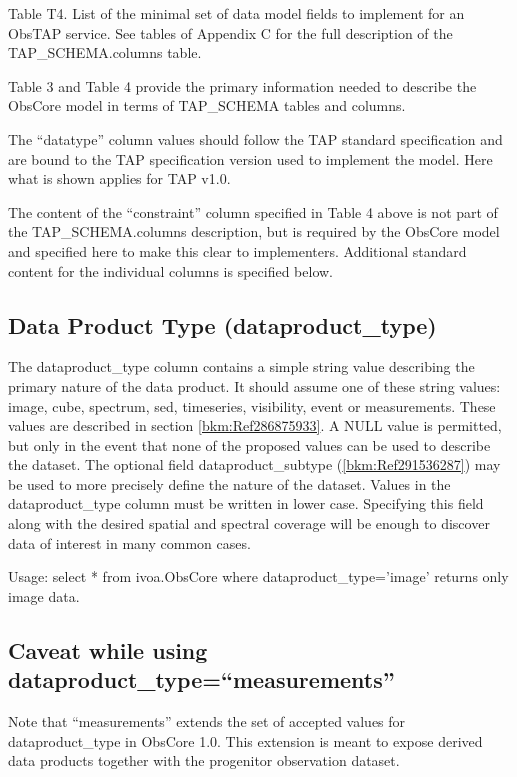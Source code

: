 \documentclass[11pt,a4paper]{ivoa}
\begin{document}
\label{tab:4}Table T4. List of the minimal set of data model fields to
implement for an ObsTAP service. See tables of Appendix C for the full description of the TAP\_SCHEMA.columns table. 

Table 3 and Table 4 provide the primary information needed to describe the ObsCore model in terms of TAP\_SCHEMA tables
and columns. 

The ``datatype'' column values should follow the TAP standard specification and are bound to the TAP specification
version used to implement the model. Here what is shown applies for TAP v1.0. 

The content of the ``constraint'' column specified in Table 4 above is not part of the TAP\_SCHEMA.columns description,
but is required by the ObsCore model and specified here to make this clear to implementers.  Additional standard
content for the individual columns is specified below. 

\subsection{Data Product Type (dataproduct\_type)}
The dataproduct\_type column contains a simple string value describing the primary nature of the data product.  It
should assume one of these string values: image, cube, spectrum, sed, timeseries, visibility, event or measurements. 
These values are described in section \ref{bkm:Ref286875933}.  A NULL value is permitted, but only in the event that
none of the proposed values can be used to describe the dataset.  The optional field dataproduct\_subtype
(\ref{bkm:Ref291536287}) may be used to more precisely define the nature of the dataset.  Values in the
dataproduct\_type column must be written in lower case. Specifying this field along with the desired spatial and
spectral coverage will be enough to discover data of interest in many common cases. 

Usage: select * from ivoa.ObsCore where dataproduct\_type='image' returns only image data.

\subsection{ Caveat while using dataproduct\_type=``measurements''}
Note that ``measurements'' extends the set of accepted values for dataproduct\_type in ObsCore 1.0. This extension is
meant to expose derived data products together with the progenitor observation dataset. 
\end{document}
